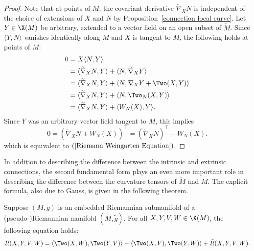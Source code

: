 \begin{proof}
Note that at points of $M$, the covariant derivative $\widetilde{\nabla}_XN$ is independent of the choice of extensions of $X$ and $N$ by Proposition~\ref{connection local curve}. Let $Y\in\X(M)$ be arbitrary, extended to a vector field on an open subset of $\widetilde{M}$. Since $\langle Y,N\rangle$ vanishes identically along $M$ and $X$ is tangent to $M$, the following holds at points of $M$:
\begin{align*}
0&=X\langle N,Y\rangle\\
&=\langle\widetilde{\nabla}_XN,Y\rangle+\langle N,\widetilde{\nabla}_XY\rangle\\
&=\langle\widetilde{\nabla}_XN,Y\rangle+\langle N,\nabla_XY+\Two(X,Y)\rangle\\
&=\langle\widetilde{\nabla}_XN,Y\rangle+\langle N,\Two_N(X,Y)\rangle\\
&=\langle\widetilde{\nabla}_XN,Y\rangle+\langle W_N(X),Y\rangle.
\end{align*}
Since $Y$ was an arbitrary vector field tangent to $M$, this implies
\[0=(\widetilde{\nabla}_XN+W_N(X))^{\top}=(\widetilde{\nabla}_XN)^\top+W_N(X).\]
which is equivalent to $(\ref{Riemann Weingarten Equation})$.
\end{proof}
In addition to describing the difference between the intrinsic and extrinsic connections, the second fundamental form plays an even more important role in describing the difference between the curvature tensors of $\widetilde{M}$ and $M$. The explicit formula, also due to Gauss, is given in the following theorem.
\begin{theorem}
Suppose $(M,g)$ is an embedded Riemannian submanifold of a (pseudo-)Riemannian manifold $(\widetilde{M},\tilde{g})$. For all $X,Y,V,W\in\X(M)$, the following equation holds:
\begin{align}\label{Riemann submani Guass equation}
R(X,Y,V,W)=\langle\Two(X,W),\Two(Y,V)\rangle-\langle\Two(X,V),\Two(Y,W)\rangle+\tilde{R}(X,Y,V,W).
\end{align}
\end{theorem}
